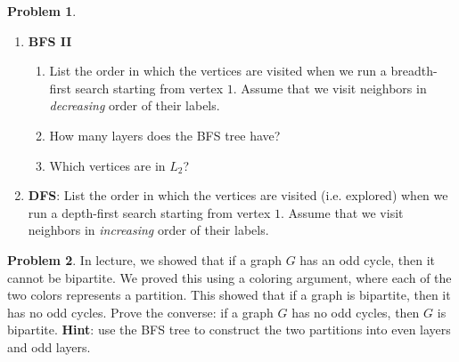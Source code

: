 \documentclass[10pt]{article}
\theoremstyle{definition}
\newtheorem{problem}{Problem}
\newenvironment{solution}{\begin{proof}[Solution]}{\end{proof}}
\begin{document}
\begin{problem}
\begin{enumerate}[label=(\alph*)]
        \item \textbf{BFS II} 
        \begin{enumerate}[label=(\roman*)]
            \item List the order in which the vertices are visited when we run a breadth-first search starting from vertex $1$. Assume that we visit neighbors in \emph{decreasing} order of their labels.
            \item How many layers does the BFS tree have? 
            \item Which vertices are in $L_2$?
        \end{enumerate}
        
        \item \textbf{DFS}: List the order in which the vertices are visited (i.e. explored) when we run a depth-first search starting from vertex $1$. Assume that we visit neighbors in \emph{increasing} order of their labels.
    \end{enumerate}
\end{problem}


\begin{problem}
    In lecture, we showed that if a graph $G$ has an odd cycle, then it cannot be bipartite. We proved this using a coloring argument, where each of the two colors represents a partition. This showed that if a graph is bipartite, then it has no odd cycles. Prove the converse: if a graph $G$ has no odd cycles, then $G$ is bipartite. \textbf{Hint}: use the BFS tree to construct the two partitions into even layers and odd layers.
\end{problem}

\end{document}
